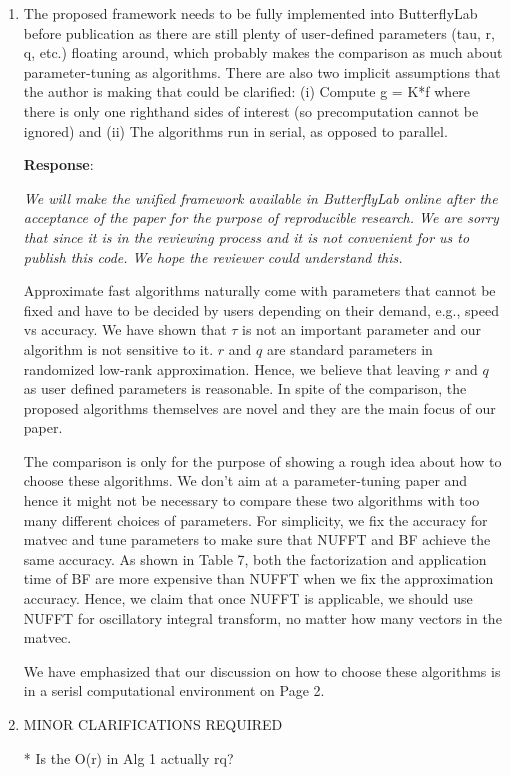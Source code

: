 \documentclass[11pt]{article}
\newcommand{\Response}{{\bf Response}}
\begin{document}
\begin{enumerate}
\item The proposed framework needs to be fully implemented into ButterflyLab before publication as there are still plenty of user-defined parameters (tau, r, q, etc.) floating around, which probably makes the comparison as much about parameter-tuning as algorithms. There are also two implicit assumptions that the author is making that could be clarified: (i) Compute g = K*f where there is only one righthand sides of interest (so precomputation cannot be ignored) and (ii) The algorithms run in serial, as opposed to parallel.


\Response: {\it  We will make the unified framework available in ButterflyLab online after the acceptance of the paper for the purpose of reproducible research. We are sorry that since it is in the reviewing process and it is not convenient for us to publish this code. We hope the reviewer could understand this. 

Approximate fast algorithms naturally come with parameters that cannot be fixed and have to be decided by users depending on their demand, e.g., speed vs accuracy.  We have shown that $\tau$ is not an important parameter and our algorithm is not sensitive to it. $r$ and $q$ are standard parameters in randomized low-rank approximation. Hence, we believe that leaving $r$ and $q$ as user defined parameters is reasonable. In spite of the comparison, the proposed algorithms themselves are novel and they are the main focus of our paper. 

The comparison is only for the purpose of showing a rough idea about how to choose these algorithms. We don't aim at a parameter-tuning paper and hence it might not be necessary to compare these two algorithms with too many different choices of parameters. For simplicity, we fix the accuracy for matvec and tune parameters to make sure that NUFFT and BF achieve the same accuracy.  As shown in Table 7, both the factorization and application time of BF are more expensive than NUFFT when we fix the approximation accuracy. Hence, we claim that once NUFFT is applicable, we should use NUFFT for oscillatory integral transform, no matter how many vectors in the matvec.

We have emphasized that our discussion on how to choose these algorithms is in a serisl computational environment on Page 2.
}

\item MINOR CLARIFICATIONS REQUIRED

* Is the O(r) in Alg 1 actually rq? 


\end{enumerate}
\end{document}
